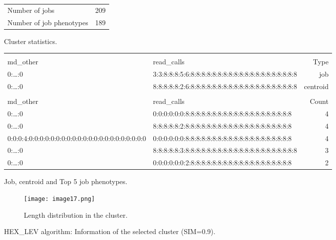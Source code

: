 \documentclass{jhps}
\begin{document}
\begin{figure}
	\begin{subtable}{\textwidth}
		\centering
		\begin{tabular}{ll}
			Number of jobs & 209 \\
			Number of job phenotypes & 189 \\
		\end{tabular}
		\caption{Cluster statistics.}
		\label{cluster:use_case:hex_lev:stats}
	\end{subtable}
	\medskip
	\begin{subtable}{\textwidth}
		\centering
		\begin{tiny}
			\begin{tabular}{ll|r}
				\rowcolor{tblhead}
				\multicolumn{2}{l|}{Hexadecimal coding} & \\
				\rowcolor{tblhead}
				md\_other                                           &  read\_calls                                           & Type     \\
				\hline
				0:\dots:0                                           &  3:3:8:8:8:5:6:8:8:8:8:8:8:8:8:8:8:8:8:8:8:8:8:8:8:8:8 & job      \\
				0:\dots:0                                           &  8:8:8:8:8:2:6:8:8:8:8:8:8:8:8:8:8:8:8:8:8:8:8:8:8:8:8 & centroid \\
				\multicolumn{3}{l}{}                                \\
				\rowcolor{tblhead}      md\_other                   &  read\_calls                                           & Count    \\
				\hline
				0:\dots:0                                           &  0:0:0:0:0:0:8:8:8:8:8:8:8:8:8:8:8:8:8:8:8:8:8:8:8:8   & 4        \\
				0:\dots:0                                           &  8:8:8:8:8:2:8:8:8:8:8:8:8:8:8:8:8:8:8:8:8:8:8:8:8:8   & 4        \\
				0:0:0:4:0:0:0:0:0:0:0:0:0:0:0:0:0:0:0:0:0:0:0:0:0:0 &  0:0:0:0:0:0:8:8:8:8:8:8:8:8:8:8:8:8:8:8:8:8:8:8:8:8   & 4        \\
				0:\dots:0                                           &  8:8:8:8:8:3:8:8:8:8:8:8:8:8:8:8:8:8:8:8:8:8:8:8:8:8:8 & 3        \\
				0:\dots:0                                           &  0:0:0:0:0:0:2:8:8:8:8:8:8:8:8:8:8:8:8:8:8:8:8:8:8:8   & 2        \\
			\end{tabular}
		\end{tiny}
		\caption{Job, centroid and Top 5 job phenotypes.}
		\label{cluster:use_case:hex_lev:top_jobs}
	\end{subtable}
	\medskip
	\begin{subfigure}{\textwidth}
		\centering
		\texttt{[image: image17.png]}
		\caption{Length distribution in the cluster.}
		\label{cluster:use_case:hex_lev:length}
	\end{subfigure}
	\caption{HEX\_LEV algorithm: Information of the selected cluster (SIM=0.9).}
	\label{cluster:use_case:hex_lev}
\end{figure}
\end{document}
